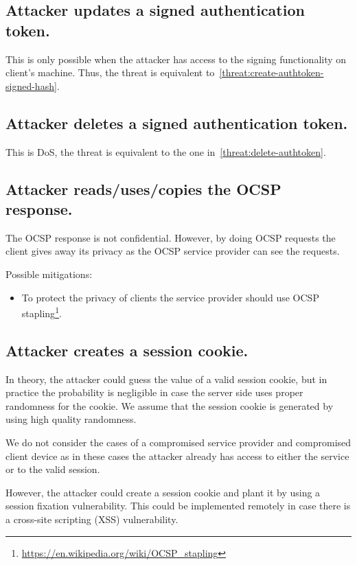 \subsection{Attacker updates a signed authentication token.}
\label{threat:update-authtoken-signed-hash}
This is only possible when the attacker has access to the signing functionality on client's machine. Thus, the threat is equivalent to~\ref{threat:create-authtoken-signed-hash}.


\subsection{Attacker deletes a signed authentication token.}
\label{threat:delete-authtoken-signed-hash}
This is DoS, the threat is equivalent to the one in~\ref{threat:delete-authtoken}.




\subsection{Attacker reads/uses/copies the OCSP response.}
\label{threat:read-OCSP}
The OCSP response is not confidential. However, by doing OCSP requests the client gives away its privacy as the OCSP service provider can see the requests. 

Possible mitigations:
\begin{itemize}
\item To protect the privacy of clients the service provider should use OCSP stapling\footnote{\url{https://en.wikipedia.org/wiki/OCSP_stapling}}.
\end{itemize}



\subsection{Attacker creates a session cookie.}
\label{threat:create-cookie}
In theory, the attacker could guess the value of a valid session cookie, but in practice the probability is negligible in case the server side uses proper randomness for the cookie. We assume that the session cookie is generated by using high quality randomness. 

We do not consider the cases of a compromised service provider and compromised client device as in these cases the attacker already has access to either the service or to the valid session. 

However, the attacker could create a session cookie and plant it by using a session fixation vulnerability. This could be implemented remotely in case there is a cross-site scripting (XSS) vulnerability.

